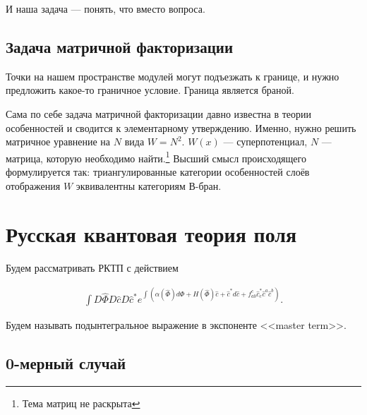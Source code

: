 \documentclass[11pt]{article}
\def\be{\numberwithin{equation}{section}\begin{eqnarray}}
\def\ee{\end{eqnarray}}
\def\p{\partial}
\theoremstyle{remark}
\theoremstyle{definition}
\newcommand{\que}[1]{\footnote{\textcolor[rgb]{0.38,0.69,0.82}{#1}}}
\begin{document}
И наша задача --- понять, что вместо вопроса.

\subsection{Задача матричной факторизации}

Точки на нашем пространстве модулей могут подъезжать к границе, и нужно предложить какое-то граничное условие. Граница является браной.

Сама по себе задача матричной факторизации давно известна в теории особенностей и сводится к элементарному утверждению. Именно, нужно решить матричное уравнение на $N$ вида $W = N^2$. $W(x)$ --- суперпотенциал, $N$ --- матрица, которую необходимо найти.\que{Тема матриц не раскрыта} Высший смысл происходящего формулируется так: триангулированные категории особенностей слоёв отображения $W$ эквивалентны категориям В-бран.

\section{Русская квантовая теория поля}

Будем рассматривать РКТП с действием

\be\label{RQFT} \int D\hat\Phi D\hat c D\hat c^* e^{\int (\alpha(\hat \Phi) d\hat \Phi + H(\hat \Phi) \hat c + \hat c^* d \hat c + f_{ab}^c \hat c_c^* \hat c^a \hat c^b)}. \ee

Будем называть подынтегральное выражение в экспоненте <<master term>>.

\subsection{0-мерный случай}
\end{document}
